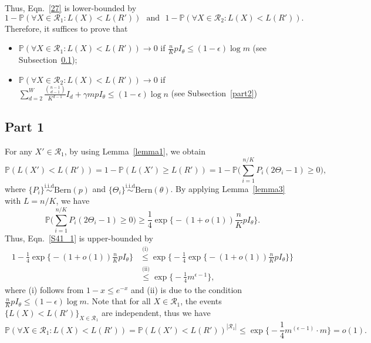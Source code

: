 \documentclass{article}
\begin{document}
Thus, Eqn.~\eqref{27} is lower-bounded by
$$
1- \mathbb{P} (\forall X \in \mathcal{R}_1: L(X)<L(R')) \mathrm{ \ \ \ and \ \ \ } 1-  \mathbb{P} (\forall X \in \mathcal{R}_2: L(X)<L(R')).
$$
Therefore, it suffices to prove that 
\begin{itemize}[wide, labelwidth=!, labelindent=10pt]
    \item $\mathbb{P} (\forall X \in \mathcal{R}_1: L(X)<L(R')) \rightarrow 0$ if  $\frac{n}{K} p I_\theta \leq (1-\epsilon) \log m$ (see Subsection~\ref{part1});
    \item $\mathbb{P} (\forall X \in \mathcal{R}_2: L(X)<L(R')) \rightarrow 0$ if $ \sum_{d=2}^{W} \frac{\binom{n-1}{d-1}}{K^{d-1}} I_d + \gamma m p I_\theta \leq (1-\epsilon) \log n$ (see Subsection~\ref{part2})
\end{itemize}


\subsection{Part 1}\label{part1}
For any $X' \in \mathcal{R}_1$, by using Lemma~\ref{lemma1}, we obtain
\begin{equation}\label{S41_1}
    \mathbb{P} ( L(X') < L(R') ) = 1 - \mathbb{P} ( L(X') \geq L(R') ) = 1- \mathbb{P} \Big( \sum_{i=1}^{n/K} P_i (2\Theta_i -1) \geq 0 \Big),
\end{equation}
where $\{P_i\} \overset{\text{i.i.d}}{\sim} \text{Bern}(p)$ and $\{\Theta_i\} \overset{\text{i.i.d}}{\sim} \text{Bern}(\theta)$.
By applying Lemma~\ref{lemma3} with $L=n/K$, we have 
\begin{equation}
    \mathbb{P} \Big( \sum_{i=1}^{n/K} P_i (2\Theta_i -1) \geq 0 \Big) \geq \frac{1}{4} \exp \Big\{  -(1+o(1))  \frac{n}{K} p I_{\theta} \Big\}.
\end{equation}
Thus, Eqn.~\eqref{S41_1} is upper-bounded by
\begin{equation}
\begin{aligned}
        1 - \frac{1}{4} \exp \Big\{  -(1+o(1))  \frac{n}{K} p I_{\theta} \Big\} &\overset{\text{(i)}}{\leq} \exp \Bigg\{  - \frac{1}{4} \exp \Big\{  -(1+o(1))  \frac{n}{K} p I_{\theta} \Big\} \Bigg\}  \\
        & \overset{\text{(ii)}}{\leq} \exp \Big\{  -\frac{1}{4} m^{\epsilon-1} \Big\},
\end{aligned}
\end{equation}
where (i) follows from $1-x \leq e^{-x}$ and (ii) is due to the condition $\frac{n}{K} p I_\theta \leq (1-\epsilon) \log m$.
Note that for all $X \in \mathcal{R}_1$, the events $\{L(X) < L(R')\}_{X \in \mathcal{R}_1}$ are independent, thus we have
$$
\mathbb{P} (\forall X \in \mathcal{R}_1: L(X)<L(R')) = \mathbb{P} (L(X')<L(R')) ^{|\mathcal{R}_1|} \leq \exp \Big\{  -\frac{1}{4} m^{(\epsilon-1)} \cdot m \Big\} = o(1).
$$
\end{document}
